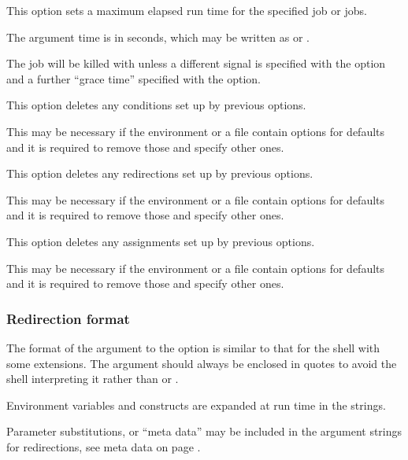 This option sets a maximum elapsed run time for the specified job or jobs.

The argument time is in seconds, which may be written as  or .

The job will be killed with  unless a different signal is specified with the  option and a further ``grace time'' specified with the  option.


This option deletes any conditions set up by previous  options.

This may be necessary if the environment or a \configurationfile{} file contain  options for defaults and it is required to remove those and specify other ones.


This option deletes any redirections set up by previous  options.

This may be necessary if the environment or a \configurationfile{} file contain 
options for defaults and it is required to remove those and specify other ones.


This option deletes any assignments set up by previous  options.

This may be necessary if the environment or a \configurationfile{} file contain
 options for defaults and it is required to remove those and specify other ones.


\subsubsection{Redirection format}
The format of the argument to the  option is similar to that for the shell with some extensions. The argument should
always be enclosed in quotes to avoid the shell interpreting it rather than \PrBtr{} or \PrRbtr{}.

Environment variables and  constructs are expanded at run time in the strings.

Parameter substitutions, or ``meta data'' may be included in the argument strings for redirections, see meta data on page \pageref{bkm:Metadata}.

